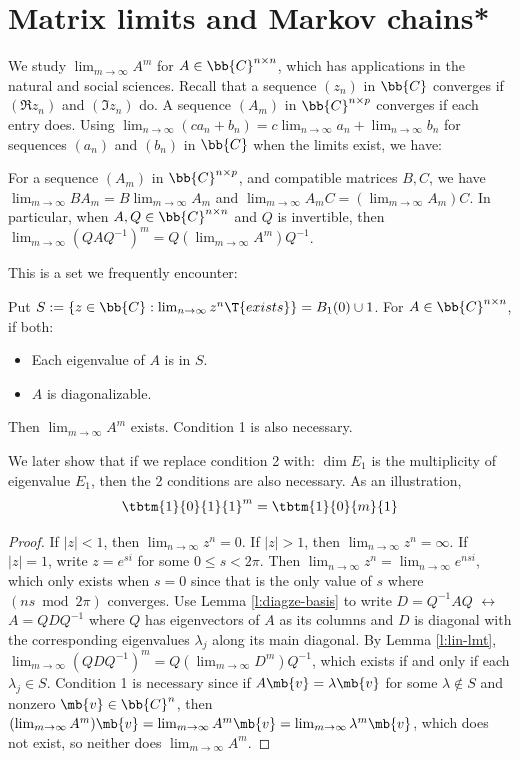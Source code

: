 \section{Matrix limits and Markov chains*}
We study $\lim_{m \to \infty}A^m$ for $A \in \bb{C}^{n \times n}$, which has applications in the natural and social sciences.
Recall that a sequence $(z_n)$ in $\bb{C}$ converges if $( \Re z_n)$ and $( \Im z_n)$ do. A sequence $(A_m)$ in $\bb{C}^{n \times p}$ converges if each entry does.
Using $\lim_{n \to \infty}(ca_n+b_n)=c \lim_{n \to \infty}a_n+ \lim_{n \to \infty}b_n$ for sequences $(a_n)$ and $(b_n)$ in $\bb{C}$ when the limits exist, we have:
\begin{lem}\label{l:lin-lmt}
For a sequence $(A_m)$ in $\bb{C}^{n \times p}$, and compatible matrices $B,C$, we have $\lim_{m \to \infty}BA_m=B \lim_{m \to \infty}A_m$ and $\lim_{m \to \infty}A_mC=( \lim_{m \to \infty}A_m)C$. In particular, when $A,Q \in \bb{C}^{n \times n}$ and $Q$ is invertible, then $\lim_{m \to \infty}(QAQ^{-1})^m= Q( \lim_{m \to \infty}A^m)Q^{-1}$.
\end{lem}
This is a set we frequently encounter:
\begin{lem}\label{l:mat-power0}
Put $S:= \{ z \in \bb{C}: \lim_{n \to \infty}z^n \T{ exists}\} = B_1(0) \cup {1}$. For $A \in \bb{C}^{n \times n}$, if both:
\begin{itemize}
\item Each eigenvalue of $A$ is in $S$.
\item $A$ is diagonalizable.
\end{itemize}
Then $\lim_{m \to \infty}A^m$ exists. Condition 1 is also necessary.
\end{lem}
We later show that if we replace condition 2 with: $\dim E_1$ is the multiplicity of eigenvalue $E_1$, then the 2 conditions are also necessary. As an illustration,
\[ \tbtm{1}{0}{1}{1}^m= \tbtm{1}{0}{m}{1}\]
\begin{proof}
If $|z|<1$, then $\lim_{n \to \infty}z^n=0$. If $|z|>1$, then $\lim_{n \to \infty}z^n= \infty$. If $|z|=1$, write $z=e^{si}$ for some $0 \leq s <2 \pi$.
Then $\lim_{n \to \infty}z^n= \lim_{n \to \infty}e^{nsi}$, which only exists when $s=0$ since that is the only value of $s$ where $(ns \bmod 2 \pi)$ converges.
Use Lemma \ref{l:diagze-basis} to write $D=Q^{-1}AQ$ $\leftrightarrow$ $A=QDQ^{-1}$ where $Q$ has eigenvectors of $A$ as its columns and $D$ is diagonal with the corresponding eigenvalues $\lambda_j$ along its main diagonal.
By Lemma \ref{l:lin-lmt}, $\lim_{m \to \infty}(QDQ^{-1})^m= Q( \lim_{m \to \infty}D^m)Q^{-1}$, which exists if and only if each $\lambda_j \in S$.
Condition 1 is necessary since if $A \mb{v}= \lambda \mb{v}$ for some $\lambda \notin S$ and nonzero $\mb{v}\in \bb{C}^n$, then $( \lim_{m \to \infty}A^m) \mb{v}= \lim_{m \to \infty}A^m \mb{v}= \lim_{m \to \infty}\lambda^m \mb{v}$, which does not exist, so neither does $\lim_{m \to \infty}A^m$.
\end{proof}
